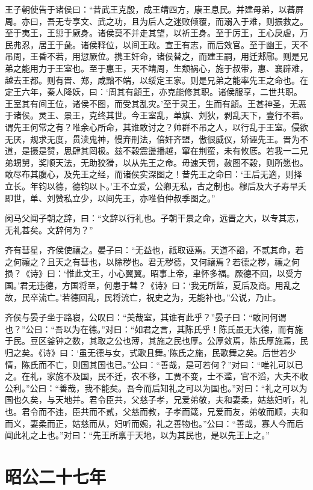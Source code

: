 \documentclass[a4paper,12pt,UTF8,twoside]{ctexbook}
\begin{document}
王子朝使告于诸侯曰：“昔武王克殷，成王靖四方，康王息民。并建母弟，以蕃屏周。亦曰，吾无专享文、武之功，且为后人之迷败倾覆，而溺入于难，则振救之。至于夷王，王愆于厥身。诸侯莫不并走其望，以祈王身。至于厉王，王心戾虐，万民弗忍，居王于彘。诸侯释位，以间王政。宣王有志，而后效官。至于幽王，天不吊周，王昏不若，用愆厥位。携王奸命，诸侯替之，而建王嗣，用迁郏鄏。则是兄弟之能用力于王室也。至于惠王，天不靖周，生颓祸心，施于叔带，惠、襄辟难，越去王都。则有晋、郑，咸黜不端，以绥定王家。则是兄弟之能率先王之命也。在定王六年，秦人降妖，曰：‘周其有頿王，亦克能修其职。诸侯服享，二世共职。王室其有间王位，诸侯不图，而受其乱灾。’至于灵王，生而有頿。王甚神圣，无恶于诸侯。灵王、景王，克终其世。今王室乱，单旗、刘狄，剥乱天下，壹行不若。谓先王何常之有？唯余心所命，其谁敢讨之？帅群不吊之人，以行乱于王室。侵欲无厌，规求无度，贯渎鬼神，慢弃刑法，倍奸齐盟，傲很威仪，矫诬先王。晋为不道，是摄是赞，思肆其罔极。兹不穀震盪播越，窜在荆蛮，未有攸厎。若我一二兄弟甥舅，奖顺天法，无助狡猾，以从先王之命。毋速天罚，赦图不穀，则所愿也。敢尽布其腹心，及先王之经，而诸侯实深图之！昔先王之命曰：‘王后无適，则择立长。年钧以德，德钧以卜。’王不立爱，公卿无私，古之制也。穆后及大子寿早夭即世，单、刘赞私立少，以间先王，亦唯伯仲叔季图之。”

闵马父闻子朝之辞，曰：“文辞以行礼也。子朝干景之命，远晋之大，以专其志，无礼甚矣。文辞何为？”

齐有彗星，齐侯使禳之。晏子曰：“无益也，祇取诬焉。天道不謟，不贰其命，若之何禳之？且天之有彗也，以除秽也。君无秽德，又何禳焉？若德之秽，禳之何损？《诗》曰：‘惟此文王，小心翼翼。昭事上帝，聿怀多福。厥德不回，以受方国。’君无违德，方国将至，何患于彗？《诗》曰：‘我无所监，夏后及商。用乱之故，民卒流亡。’若德回乱，民将流亡，祝史之为，无能补也。”公说，乃止。

齐侯与晏子坐于路寝，公叹曰：“美哉室，其谁有此乎？”晏子曰：“敢问何谓也？”公曰：“吾以为在德。”对曰：“如君之言，其陈氏乎！陈氏虽无大德，而有施于民。豆区釜钟之数，其取之公也薄，其施之民也厚。公厚敛焉，陈氏厚施焉，民归之矣。《诗》曰：‘虽无德与女，式歌且舞。’陈氏之施，民歌舞之矣。后世若少情，陈氏而不亡，则国其国也已。”公曰：“善哉，是可若何？”对曰：“唯礼可以已之。在礼，家施不及国，民不迁，农不移，工贾不变，士不滥，官不滔，大夫不收公利。”公曰：“善哉，我不能矣。吾今而后知礼之可以为国也。”对曰：“礼之可以为国也久矣，与天地并。君令臣共，父慈子孝，兄爱弟敬，夫和妻柔，姑慈妇听，礼也。君令而不违，臣共而不贰，父慈而教，子孝而箴，兄爱而友，弟敬而顺，夫和而义，妻柔而正，姑慈而从，妇听而婉，礼之善物也。”公曰：“善哉，寡人今而后闻此礼之上也。”对曰：“先王所禀于天地，以为其民也，是以先王上之。”


\chapter{昭公二十七年}
\end{document}
